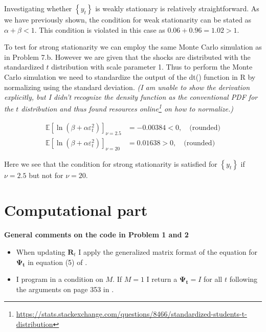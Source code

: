 \documentclass{EconHomework}
\begin{document}
Investigating whether $\left\{ y_{t}\right\} $ is weakly stationary
is relatively straightforward. As we have previously shown, the condition
for weak stationarity can be stated as $\alpha+\beta<1$. This condition
is violated in this case as $0.06+0.96=1.02>1$. 

\bigskip

To test for strong stationarity we can employ the same Monte Carlo simulation as in Problem 7.b. However we are given that the shocks are distributed with the standardized $t$ distribution with scale parameter 1. Thus to perform the Monte Carlo simulation we need to standardize the output of the dt() function in R by normalizing using the standard deviation. \textit{(I am unable to show the derivation explicitly, but I didn't recognize the density function as the conventional PDF for the $t$ distribution and thus found resources online\footnote{\href{https://stats.stackexchange.com/questions/8466/standardized-students-t-distribution}{https://stats.stackexchange.com/questions/8466/standardized-students-t-distribution}} on how to normalize.)}

\begin{align*}
    \mathbb{E}\left[\ln\left(\beta+\alpha\varepsilon_{t}^{2}\right)\right]_{\nu=2.5}&=-0.00384<0,\quad\text{(rounded)}\\
    \mathbb{E}\left[\ln\left(\beta+\alpha\varepsilon_{t}^{2}\right)\right]_{\nu=20}&=0.01638>0,\quad\text{(rounded)}
\end{align*}

Here we see that the condition for strong stationarity is satisfied for $\left\{ y_{t}\right\}$ if $\nu=2.5$ but not for $\nu=20$.

\pagebreak
\setcounter{section}{0}
\part*{Computational part}

\begin{tcolorbox}
    \textbf{General comments on the code in Problem 1 and 2}
    \begin{itemize}
        \item When updating $\mathbf{R}_{t}$ I apply the generalized matrix format of the equation for $\boldsymbol{\Psi_t}$ in equation (5) of \cite{tsetsui2002}.
        \item I program in a condition on $M$. If $M=1$ I return a $\boldsymbol{\Psi_t}=I$ for all $t$ following the arguments on page 353 in \cite{tsetsui2002}.
    \end{itemize}
\end{tcolorbox}
\end{document}
